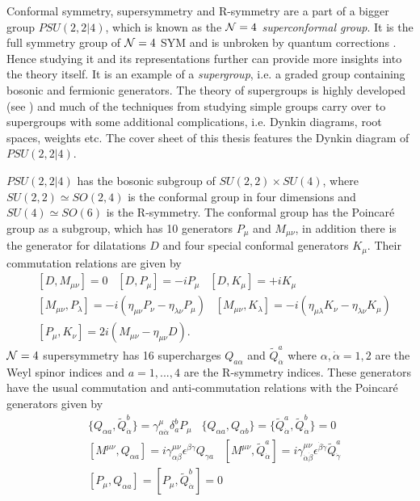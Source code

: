 Conformal symmetry, supersymmetry and R-symmetry are a part of a bigger group $PSU(2,2|4)$, which is known as the \emph{$\mathcal{N}=4$ superconformal group}. It is the full symmetry group of $\mathcal{N}=4$ SYM and is unbroken by quantum corrections \cite{minahan_spinchains}. Hence studying it and its representations further can provide more insights into the theory itself. It is an example of a \emph{supergroup}, i.e. a graded group containing bosonic and fermionic generators. The theory of supergroups is highly developed (see \cite{beisert_conformal}) and much of the techniques from studying simple groups carry over to supergroups with some additional complications, i.e. Dynkin diagrams, root spaces, weights etc. The cover sheet of this thesis features the Dynkin diagram of $PSU(2,2|4)$.

$PSU(2,2|4)$ has the bosonic subgroup of $SU(2,2) \times SU(4)$, where $SU(2,2) \simeq SO(2,4)$ is the conformal group in four dimensions and $SU(4) \simeq SO(6)$ is the R-symmetry. The conformal group has the Poincar\'{e} group as a subgroup, which has 10 generators $P_\mu$ and $M_{\mu\nu}$, in addition there is the generator for dilatations $D$ and four special conformal generators $K_\mu$. Their commutation relations are given by \cite{minahan_spinchains}
\begin{eqnarray}
 &[D, M_{\mu\nu}] = 0 \; \; \; [D, P_\mu] = -i P_\mu \; \; \; [D, K_\mu] = +i K_\mu  \nonumber\\
 &[M_{\mu\nu}, P_\lambda] = -i(\eta_{\mu\nu} P_\nu - \eta_{\lambda\nu} P_\mu) \; \; \; [M_{\mu\nu}, K_\lambda] = -i(\eta_{\mu\lambda} K_\nu - \eta_{\lambda\nu} K_\mu)  \nonumber\\
 &[P_\mu, K_\nu] = 2i(M_{\mu\nu} - \eta_{\mu\nu} D).
 \label{eq:conformal_group}
\end{eqnarray}
$\mathcal{N}=4$ supersymmetry has 16 supercharges $Q_{a\alpha}$ and $\tilde{Q}^a_{\dot{\alpha}}$ where $\alpha, \dot{\alpha} = 1, 2$ are the Weyl spinor indices and $a = 1,...,4$ are the R-symmetry indices. These generators have the usual commutation and anti-commutation relations with the Poincar\'{e} generators given by
\begin{eqnarray}
	& \{Q_{\alpha a}, \tilde{Q}^b_{\dot{\alpha}}\} = \gamma^\mu_{\alpha\dot{\alpha}} \delta_a^b P_\mu \; \; \; \{Q_{\alpha a}, Q_{\alpha b}\} = \{ \tilde{Q}^a_{\dot{\alpha}}, \tilde{Q}^b_{\dot{\alpha}} \} = 0 \nonumber\\
	& [M^{\mu\nu}, Q_{\alpha a}] = i \gamma^{\mu\nu}_{\alpha\beta} \epsilon^{\beta\gamma} Q_{\gamma a} \; \; \; [M^{\mu\nu}, \tilde{Q}^a_{\dot{\alpha}}] = i \gamma^{\mu\nu}_{\dot{\alpha}\dot{\beta}} \epsilon^{\dot{\beta}\dot{\gamma}} \tilde{Q}_{\dot{\gamma}}^a \nonumber \\
	& [P_\mu, Q_{\alpha a}] = [P_\mu, \tilde{Q}^b_{\dot{\alpha}}] = 0 
\end{eqnarray} 
